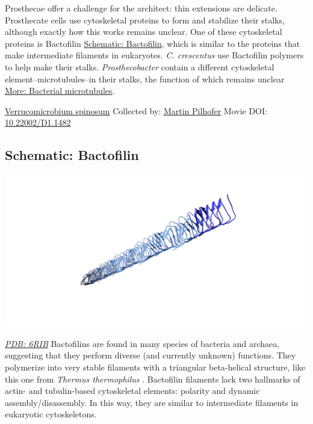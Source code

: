 \documentclass[]{tufte-book}
\begin{document}
Prosthecae offer a challenge for the architect: thin extensions are delicate. Prosthecate cells use cytoskeletal proteins to form and stabilize their stalks, although exactly how this works remains unclear. One of these cytoskeletal proteins is Bactofilin \protect\hyperlink{Bactofilin}{Schematic: Bactofilin}, which is similar to the proteins that make intermediate filaments in eukaryotes. \emph{C. crescentus} use Bactofilin polymers to help make their stalks. \emph{Prosthecobacter} contain a different cytoskeletal element--microtubules--in their stalks, the function of which remains unclear \protect\hyperlink{Bacterial_microtubules}{More: Bacterial microtubules}.



\hypertarget{htmlwidget-8359f7b3723f776f94f7}{}

\label{fig:3-6}\protect\hyperlink{tree}{Verrucomicrobium spinosum} Collected by: \protect\hyperlink{martin_pilhofer}{Martin Pilhofer} Movie DOI: \href{https://doi.org/10.22002/D1.1482}{10.22002/D1.1482}

\hypertarget{Bactofilin}{%
\subsection*{Schematic: Bactofilin}\label{Bactofilin}}

\includegraphics{img/schematics/3_6_1}

\href{http://rcsb.org/structure/6RIB}{\emph{PDB: 6RIB}}
Bactofilins are found in many species of bacteria and archaea, suggesting that they perform diverse (and currently unknown) functions. They polymerize into very stable filaments with a triangular beta-helical structure, like this one from \emph{Thermus thermophilus} \citep{deng2019}. Bactofilin filaments lack two hallmarks of actin- and tubulin-based cytoskeletal elements: polarity and dynamic assembly/disassembly. In this way, they are similar to intermediate filaments in eukaryotic cytoskeletons.
\end{document}
